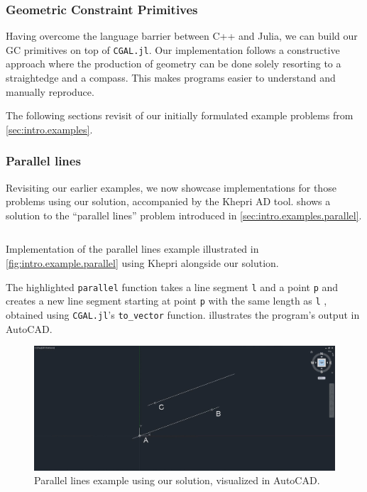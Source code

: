 \subsubsection{Geometric Constraint Primitives}%
\label{sec:solution.impl.gcps}

Having overcome the language barrier between C++ and Julia, we can build our
\ac{GC} primitives on top of \texttt{CGAL.jl}.  Our implementation follows a
constructive approach where the production of geometry can be done solely
resorting to a straightedge and a compass.  This makes programs easier to
understand and manually reproduce.

The following sections revisit of our initially formulated example problems from
\cref{sec:intro.examples}.

\subsubsection*{Parallel lines}%
\label{sec:solution.impl.gcps.parallel}

Revisiting our earlier examples, we now showcase implementations for those
problems using our solution, accompanied by the Khepri \ac{AD} tool.
 shows a solution to the ``parallel
lines'' problem introduced in \cref{sec:intro.examples.parallel}.

\begin{listing}[htbp]
  \inputminted[highlightlines={4,6-7,16}]{julia}{jl/ex_parallel.jl}
  \caption[Parallel lines example using our solution]{
    Implementation of the parallel lines example illustrated in
    \cref{fig:intro.example.parallel} using Khepri alongside our solution.}%
  \label{lst:solution.impl.gcps.parallel}
\end{listing}

The highlighted \texttt{parallel} function takes a line segment \texttt{l} and a
point \texttt{p} and creates a new line segment starting at point \texttt{p}
with the same length as \texttt{l} , obtained using \texttt{CGAL.jl}'s
\texttt{to\_vector} function.  
illustrates the program's output in AutoCAD.

\begin{figure}[htbp]
  \includegraphics[width=\linewidth]{fig/autocad-parallel} 
  \caption{Parallel lines example using our solution, visualized in AutoCAD\@.}%
  \label{fig:solution.impl.gcps.parallel}
\end{figure}

